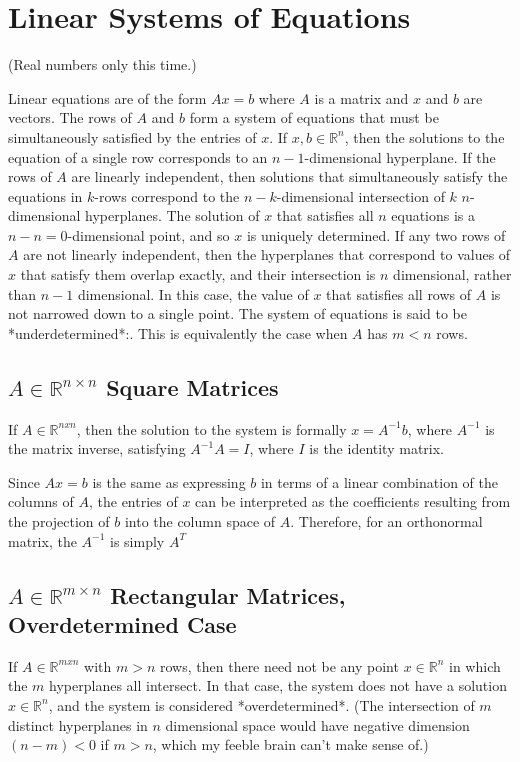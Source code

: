 \section{Linear Systems of Equations}
\label{sec:linearequations}

(Real numbers only this time.)

Linear equations are of the form $Ax = b$ where $A$ is a matrix and $x$ and $b$ are vectors. The rows of $A$ and $b$ form a system of equations that must be simultaneously satisfied by the entries of $x$. If $x,b\in\mathbb{R}^n$, then the solutions to the equation of a single row corresponds to an $n-1$-dimensional hyperplane. If the rows of $A$ are linearly independent, then solutions that simultaneously satisfy the equations in $k$-rows correspond to the $n-k$-dimensional intersection of $k$ $n$-dimensional hyperplanes. The solution of $x$ that satisfies all $n$ equations is a $n-n = 0$-dimensional point, and so $x$ is uniquely determined. If any two rows of $A$ are not linearly independent, then the hyperplanes that correspond to values of $x$ that satisfy them overlap exactly, and their intersection is $n$ dimensional, rather than $n-1$ dimensional. In this case, the value of $x$ that satisfies all rows of $A$ is not narrowed down to a single point. The system of equations is said to be *underdetermined*:. This is equivalently the case when $A$ has $m<n$ rows.  

\subsection{$A\in\mathbb{R}^{n\times n}$ Square Matrices}
If $A\in\mathbb{R}^{nxn}$, then the solution to the system is formally $x = A^{-1}b$, where $A^{-1}$ is the matrix inverse, satisfying $A^{-1}A=I$, where $I$ is the identity matrix. 

Since $Ax=b$ is the same as expressing $b$ in terms of a linear combination of the columns of $A$, the entries of $x$ can be interpreted as the coefficients resulting from the projection of $b$ into the column space of $A$. Therefore, for an orthonormal matrix, the $A^{-1}$ is simply $A^T$ 

\subsection{$A\in\mathbb{R}^{m\times n}$ Rectangular Matrices, Overdetermined Case}
If $A\in\mathbb{R}^{mxn}$ with $m>n$ rows, then there need not be any point $x\in\mathbb{R}^n$ in which the $m$ hyperplanes all intersect. In that case, the system does not have a solution $x\in\mathbb{R}^n$, and the system is considered *overdetermined*. (The intersection of $m$ distinct hyperplanes in $n$ dimensional space would have negative dimension $(n-m)<0$ if $m>n$, which my feeble brain can't make sense of.)
\\

